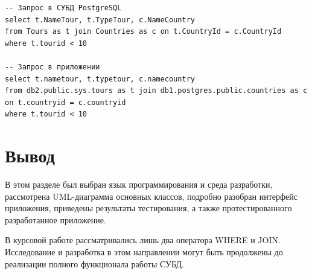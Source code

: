 \begin{lstlisting}[label=lst:test4,caption=Запрос в PostgreSQL и приложение]
-- Запрос в СУБД PostgreSQL
select t.NameTour, t.TypeTour, c.NameCountry
from Tours as t join Countries as c on t.CountryId = c.CountryId
where t.tourid < 10

-- Запрос в приложении
select t.nametour, t.typetour, c.namecountry
from db2.public.sys.tours as t join db1.postgres.public.countries as c on t.countryid = c.countryid
where t.tourid < 10
\end{lstlisting}





\section{Вывод}

В этом разделе был выбран язык программирования и среда разработки, рассмотрена UML-диаграмма основных классов, подробно разобран интерфейс приложения, приведены результаты тестирования, а также протестированного разработанное приложение.

В курсовой работе рассматривались лишь два оператора WHERE и JOIN. Исследование и разработка в этом направлении могут быть продолжены до реализации полного функционала работы СУБД.